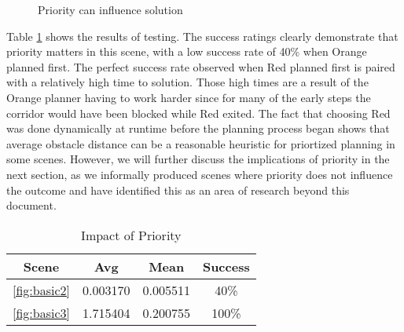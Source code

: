 \documentclass[12pt,journal,compsoc]{IEEEtran}
\begin{document}
\begin{figure}[ht]
\centering
{}
\caption{Priority can influence solution}\label{fig:basicscenes}
\end{figure}

Table \ref{basicresults} shows the results of testing. The success ratings clearly demonstrate that priority matters in this scene, with a low success rate of 40\% when Orange planned first. The perfect success rate observed when Red planned first is paired with a relatively high time to solution. Those high times are a result of the Orange planner having to work harder since for many of the early steps the corridor would have been blocked while Red exited. The fact that choosing Red was done dynamically at runtime before the planning process began shows that average obstacle distance can be a reasonable heuristic for priortized planning in some scenes. However, we will further discuss the implications of priority in the next section, as we informally produced scenes where priority does not influence the outcome and have identified this as an area of research beyond this document.

\begin{table}[ht]
\renewcommand{\arraystretch}{1.3}
\caption{Impact of Priority}
\label{basicresults}
\centering 
\begin{tabular}{||c||c||c||c||}
\hline
\bfseries Scene & \bfseries Avg & \bfseries Mean & \bfseries Success\\
\hline\hline
\ref{fig:basic2} & 0.003170 & 0.005511 & 40\%\\
\hline
\ref{fig:basic3} & 1.715404 & 0.200755 & 100\%\\
\hline
\hline
\end{tabular}
\end{table}
\end{document}
